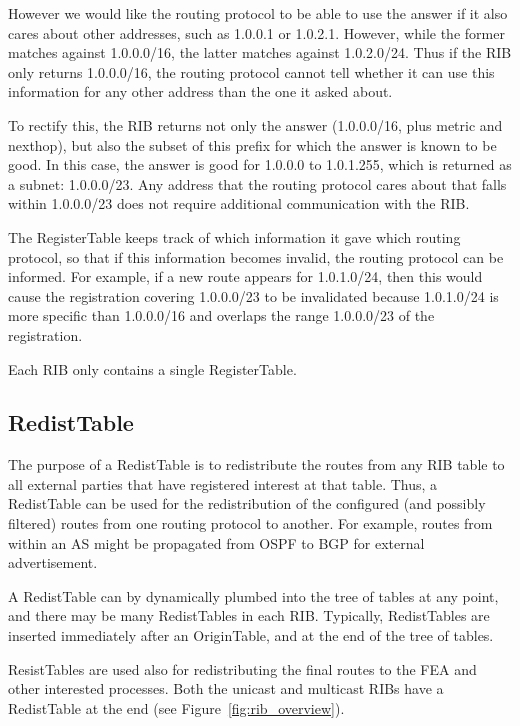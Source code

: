 \documentclass[11pt]{article}
\begin{document}
However we would like the routing protocol to be able to use the
answer if it also cares about other addresses, such as 1.0.0.1 or
1.0.2.1.  However, while the former matches against 1.0.0.0/16, the
latter matches against 1.0.2.0/24.  Thus if the RIB only returns
1.0.0.0/16, the routing protocol cannot tell whether it can use this
information for any other address than the one it asked about.

To rectify this, the RIB returns not only the answer (1.0.0.0/16, plus
metric and nexthop), but also the subset of this prefix for which the
answer is known to be good.  In this case, the answer is good for
1.0.0.0 to 1.0.1.255, which is returned as a subnet: 1.0.0.0/23.
Any address that the routing protocol cares about that falls within
1.0.0.0/23 does not require additional communication with the RIB.

The RegisterTable keeps track of which information it gave which
routing protocol, so that if this information becomes invalid, the
routing protocol can be informed.  For example, if a new route appears
for 1.0.1.0/24, then this would cause the registration covering
1.0.0.0/23 to be invalidated because 1.0.1.0/24 is more specific than
1.0.0.0/16 and overlaps the range 1.0.0.0/23 of the registration.

Each RIB only contains a single RegisterTable.

\subsection{RedistTable}

The purpose of a RedistTable is to redistribute the routes from any RIB
table to all external parties that have registered interest at that
table. Thus, a RedistTable can be used for the redistribution of the
configured (and possibly filtered) routes from one routing protocol to
another.  For example, routes from within an AS might be propagated from
OSPF to BGP for external advertisement.

A RedistTable can by dynamically plumbed into the tree of tables at any
point, and there may be many RedistTables in each RIB. Typically,
RedistTables are inserted immediately after an OriginTable, and at the
end of the tree of tables.

ResistTables are used also for redistributing the final routes to the
FEA and other interested processes. Both the unicast and multicast RIBs
have a RedistTable at the end (see Figure~\ref{fig:rib_overview}).
\end{document}

